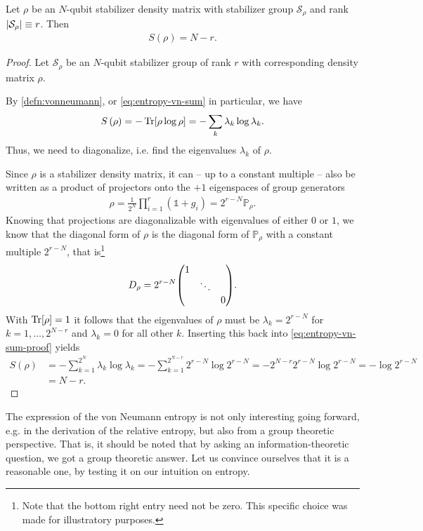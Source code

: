 \begin{lem}\label{lem:vn-ent-stab}
  Let $\rho$ be an $N$-qubit stabilizer density matrix with stabilizer group
  $\mathcal{S}_\rho$ and rank $\abs{\mathcal{S}_\rho} \equiv r$. Then
  \begin{align}
    S\left( \rho \right) = N - r
  .\end{align}
\end{lem}
\begin{proof}
  Let $\mathcal{S}_\rho$ be an $N$-qubit stabilizer group of rank $r$ with
  corresponding density matrix $\rho$.

  By \cref{defn:vonneumann}, or \cref{eq:entropy-vn-sum} in particular, we have
  \begin{align}\label{eq:entropy-vn-sum-proof}
    S\left( \rho \right) = -\Tr[\rho\log\rho] = -\sum_k \lambda_k \log
    \lambda_k
  .\end{align}
  Thus, we need to diagonalize, i.e. find the eigenvalues $\lambda_k$ of
  $\rho$.

  Since $\rho$ is a stabilizer density matrix, it can -- up to a constant
  multiple -- also be written as a
  product of projectors onto the $+1$ eigenspaces of group generators
  \begin{align}
    \rho = \frac{1}{2^N} \prod_{i=1}^r (\mathds{1} + g_i) = 2^{r-N} \mathbb{P}_\rho
  .\end{align}
  Knowing that projections are diagonalizable with eigenvalues of either $0$ or
  $1$, we know that the diagonal form of $\rho$ is the diagonal form of
  $\mathbb{P}_\rho$ with a constant multiple $2^{r-N}$, that is\footnote{Note that
    the bottom right entry need not be zero. This specific choice was made for
  illustratory purposes.}
  \begin{align}
    D_\rho = 2^{r-N} \mqty(\dmat{1,\ddots,0})
  .\end{align}
  With $\Tr[\rho] = 1$ it follows that the eigenvalues of $\rho$ must be
  $\lambda_k = 2^{r-N}$ for $k =1,\ldots,2^{N-r}$ and
  $\lambda_k = 0$ for all other $k$.
  Inserting this back into \cref{eq:entropy-vn-sum-proof} yields
  \begin{align*}
    S\left( \rho \right) 
      &= -\sum_{k=1}^{2^N} \lambda_k \log \lambda_k 
      = -\sum_{k=1}^{2^{N-r}} 2^{r-N} \log 2^{r-N} 
      = -2^{N-r} 2^{r-N} \log 2^{r-N} 
      = -\log 2^{r-N} \\
      &= N-r
  .\end{align*}
\end{proof}
The expression of the von Neumann entropy is not only interesting going
forward, e.g. in the derivation of the relative entropy, but also from a group
theoretic perspective. That is, it should be noted that by asking an
information-theoretic question, we got a group theoretic answer. Let us
convince ourselves that it is a reasonable one, by testing it on our intuition
on entropy.

